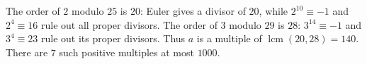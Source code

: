 The order of $2$ modulo $25$ is $20$: Euler gives a divisor of $20$, while $2^{10}\equiv-1$ and $2^4\equiv16$ rule out all proper divisors. The order of $3$ modulo $29$ is $28$: $3^{14}\equiv-1$ and $3^4\equiv23$ rule out its proper divisors. Thus $a$ is a multiple of $\operatorname{lcm}(20,28)=140$. There are $\boxed7$ such positive multiples at most $1000$.
